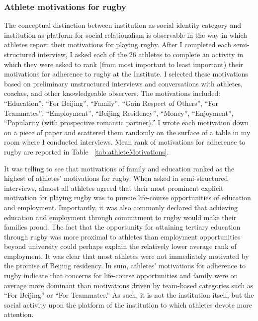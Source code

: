 \begin{CJK}{UTF8}{gbsn}
\subsubsection{Athlete motivations for rugby\label{sect:athleteMotivation}}
The conceptual distinction between institution as social identity category and institution as platform for social relationalism is observable in the way in which athletes report their motivations for playing rugby.  After I completed each semi-structured interview, I asked each of the 26 athletes to complete an activity in which they were asked to rank (from most important to least important) their motivations for adherence to rugby at the Institute.  I selected these motivations based on preliminary unstructured interviews and conversations with athletes, coaches, and other knowledgeable observers.  The motivations included: ``Education'', ``For Beijing'', ``Family'', ``Gain Respect of Others'', ``For Teammates'', ``Employment'', ``Beijing Residency'', ``Money'', ``Enjoyment'', ``Popularity (with prospective romantic partner).'' I wrote each motivation down on a piece of paper and scattered them randomly on the surface of a table in my room where I conducted interviews.  Mean rank of motivations for adherence to rugby are reported in Table ~\ref{tab:athleteMotivations}.

  

It was telling to see that motivations of family and education ranked as the highest of athletes' motivations for rugby.  When asked in semi-structured interviews, almost all athletes agreed that their most prominent explicit motivation for playing rugby was to pursue life-course opportunities of education and employment.  Importantly, it was also commonly declared that achieving education and employment through commitment to rugby would make their families proud.  The fact that the opportunity for attaining tertiary education through rugby was more proximal to athletes than employment opportunities beyond university could perhaps explain the relatively lower average rank of employment. It was clear that most athletes were not immediately motivated by the promise of Beijing residency.  In sum, athletes' motivations for adherence to rugby indicate that concerns for life-course opportunities and family were on average more dominant than motivations driven by team-based categories such as ``For Beijing'' or ``For Teammates.''  As such, it is not the institution itself, but the social activity upon the platform of the institution to which athletes devote more attention.


\end{CJK}
